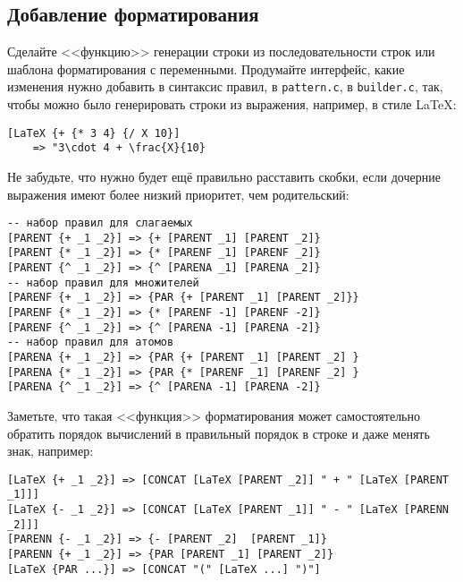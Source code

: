 \documentclass[10pt]{report}
\begin{document}
\subsection{Добавление форматирования}
Сделайте <<функцию>> генерации строки из последовательности строк или шаблона форматирования с переменными.
Продумайте интерфейс, какие изменения нужно добавить в синтаксис правил, в \verb|pattern.c|, в \verb|builder.c|, так, чтобы можно было генерировать строки из выражения, например, в стиле \LaTeX:
\begin{verbatim}
[LaTeX {+ {* 3 4} {/ X 10}] 
    => "3\cdot 4 + \frac{X}{10}
\end{verbatim}
Не забудьте, что нужно будет ещё правильно расставить скобки, если дочерние выражения имеют более низкий приоритет, чем родительский:
\begin{lstlisting}[language=rules, caption=Пример правил расстановки скобок]
-- набор правил для слагаемых
[PARENT {+ _1 _2}] => {+ [PARENT _1] [PARENT _2]}
[PARENT {* _1 _2}] => {* [PARENF _1] [PARENF _2]}
[PARENT {^ _1 _2}] => {^ [PARENA _1] [PARENA _2]}
-- набор правил для множителей
[PARENF {+ _1 _2}] => {PAR {+ [PARENT _1] [PARENT _2]}}
[PARENF {* _1 _2}] => {* [PARENF -1] [PARENF -2]}
[PARENF {^ _1 _2}] => {^ [PARENA -1] [PARENA -2]}
-- набор правил для атомов
[PARENA {+ _1 _2}] => {PAR {+ [PARENT _1] [PARENT _2] }
[PARENA {* _1 _2}] => {PAR {* [PARENF _1] [PARENF _2] }
[PARENA {^ _1 _2}] => {^ [PARENA -1] [PARENA -2]}
\end{lstlisting}
Заметьте, что такая <<функция>> форматирования может самостоятельно обратить порядок вычислений в правильный порядок в строке и даже менять знак, например:
\begin{lstlisting}[language=rules]
[LaTeX {+ _1 _2}] => [CONCAT [LaTeX [PARENT _2]] " + " [LaTeX [PARENT _1]]]
[LaTeX {- _1 _2}] => [CONCAT [LaTeX [PARENT _1]] " - " [LaTeX [PARENN _2]]]
[PARENN {- _1 _2}] => {- [PARENT _2]  [PARENT _1]}
[PARENN {+ _1 _2}] => {PAR [PARENT _1] [PARENT _2]}
[LaTeX {PAR ...}] => [CONCAT "(" [LaTeX ...] ")"]  
\end{lstlisting}
\end{document}
